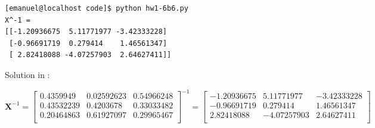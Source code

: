 \documentclass[10pt]{article}
\begin{document}
\begin{enumerate}
\begin{verbatim}
[emanuel@localhost code]$ python hw1-6b6.py 
X^-1 = 
[[-1.20936675  5.11771977 -3.42333228]
 [-0.96691719  0.279414    1.46561347]
 [ 2.82418088 -4.07257903  2.64627411]]
 \end{verbatim}

Solution in :

$\mathbf{X}^{-1} =
\begin{bmatrix}
0.4359949 & 0.02592623 &  0.54966248 \\
0.43532239 & 0.4203678  & 0.33033482 \\
0.20464863 & 0.61927097  & 0.29965467 \\
\end{bmatrix}^{-1}
= 
\begin{bmatrix}
-1.20936675 & 5.11771977 & -3.42333228 \\
-0.96691719  & 0.279414    & 1.46561347 \\
2.82418088 & -4.07257903 & 2.64627411 \\
\end{bmatrix}

$


\end{enumerate}
\end{document}
